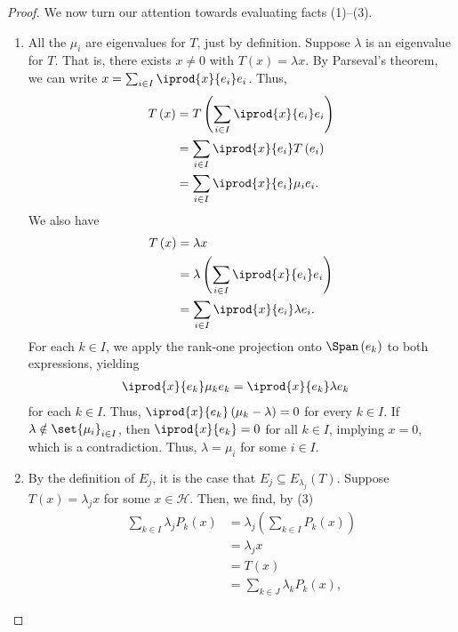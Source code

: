 \documentclass[10pt]{mypackage}
\begin{document}
\begin{proof}
  We now turn our attention towards evaluating facts (1)--(3).
  \begin{enumerate}[(1)]
    \item All the $\mu_i$ are eigenvalues for $T$, just by definition. Suppose $\lambda$ is an eigenvalue for $T$. That is, there exists $x\neq 0$ with $T\left(x\right) = \lambda x$. By Parseval's theorem, we can write $x = \sum_{i\in I} \iprod{x}{e_i} e_i$. Thus,
      \begin{align*}
        T\left(x\right) &= T\left(\sum_{i\in I} \iprod{x}{e_i}e_i\right)\\
                        &= \sum_{i\in I} \iprod{x}{e_i}T\left(e_i\right)\\
                        &= \sum_{i\in I} \iprod{x}{e_i}\mu_ie_i.
      \end{align*}
      We also have
      \begin{align*}
        T\left(x\right) &= \lambda x\\
                        &= \lambda\left(\sum_{i\in I} \iprod{x}{e_i}e_i\right)\\
                        &= \sum_{i\in I} \iprod{x}{e_i}\lambda e_i.
      \end{align*}
      For each $k\in I$, we apply the rank-one projection onto $\Span\left(e_k\right)$ to both expressions, yielding
      \begin{align*}
        \iprod{x}{e_k}\mu_ke_k &= \iprod{x}{e_k}\lambda e_k
      \end{align*}
      for each $k\in I$. Thus, $ \iprod{x}{e_k}\left(\mu_k - \lambda\right) = 0 $ for every $k\in I$. If $\lambda \notin \set{\mu_i}_{i\in I}$, then $ \iprod{x}{e_k} = 0 $ for all $k\in I$, implying $x = 0$, which is a contradiction. Thus, $\lambda = \mu_i$ for some $i\in I$.
    \item By the definition of $E_j$, it is the case that $E_j \subseteq E_{\lambda_j}\left(T\right)$. Suppose $T\left(x\right) = \lambda_j x$ for some $x\in \mathcal{H}$. Then, we find, by (3)
      \begin{align*}
        \sum_{k\in I}\lambda_jP_k\left(x\right) &= \lambda_j\left(\sum_{k\in I}P_k\left(x\right)\right)\\
                                                &= \lambda_j x\\
                                                &= T\left(x\right)\\
                                                &= \sum_{k\in J}\lambda_kP_k\left(x\right),
      \end{align*}

\end{enumerate}
\end{proof}
\end{document}

